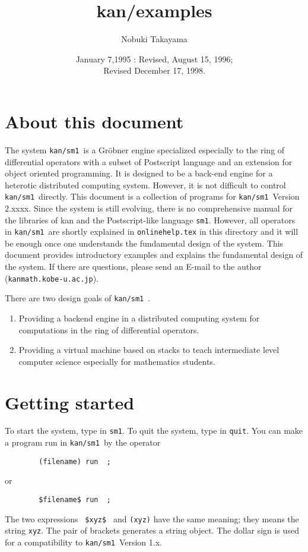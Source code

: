 \documentclass{article}
\title{\bf kan/examples}
\author{Nobuki Takayama}
\date{January 7,1995 : Revised, August 15, 1996; \\ Revised December 17, 1998.}
\def\kansm{ {\tt kan/sm1}\ }
\begin{document}
\maketitle
\tableofcontents

\section{About this document}

The system \kansm is a Gr\"obner engine specialized especially
to the ring of differential operators with a subset of
Postscript language and an extension for object oriented programming. 
It is designed to be a back-end engine for a 
heterotic distributed computing system.
However, it is not difficult to control \kansm directly.
This document is a collection of programs for \kansm Version 2.xxxx.
Since the system is still evolving, there is no comprehensive manual
for the libraries of kan and the Postscript-like language {\tt sm1}.
However, all operators in \kansm are shortly explained in
{\tt onlinehelp.tex} in this directory and
it will be enough once one understands the fundamental design of the system.
This document provides introductory examples
and explains the fundamental design of the system.
If there are questions,
please send an E-mail to the author 
({\tt kan\at math.kobe-u.ac.jp}).


There are two design goals of \kansm.
\begin{enumerate}
\item Providing a backend engine in a distributed computing system for
      computations in the ring of differential operators.
\item Providing a virtual machine based on stacks to teach intermediate
level computer science especially for mathematics students.
\end{enumerate}

\section{Getting started}

To start the system, type in {\tt sm1}.
To quit the system, type in {\tt quit}.
You can make a program run in \kansm by the operator
\begin{verbatim}
        (filename) run  ;
\end{verbatim}
or
\begin{verbatim}
        $filename$ run  ;
\end{verbatim}
The two expressions \verb! $xyz$ ! and {\tt (xyz)} have the same meaning;
they means the string {\tt xyz}.
The pair of brackets generates a string object.
The dollar sign is used for a compatibility to \kansm Version 1.x.
\end{document}
